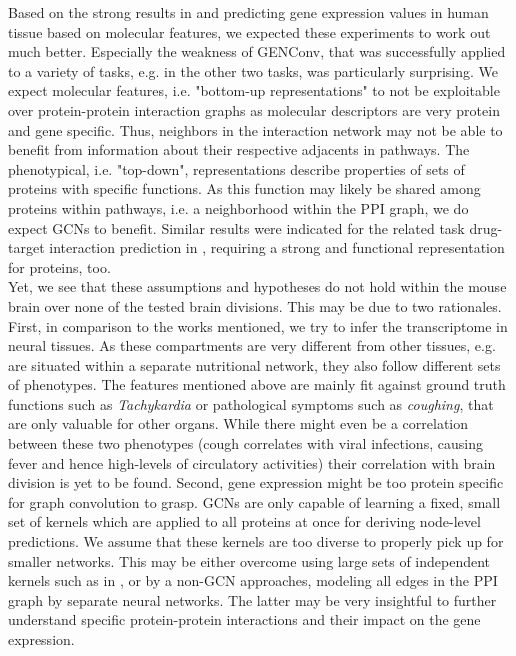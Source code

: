 \documentclass[]{article}
\begin{document}
Based on the strong results in \citet{schulte2021integration} and \citet{wang2021mogonet} predicting gene expression values in human tissue based on molecular features, we expected these experiments to work out much better. Especially the weakness of GENConv, that was successfully applied to a variety of tasks, e.g. in the other two tasks, was particularly surprising. 
We expect molecular features, i.e. "bottom-up representations" to not be exploitable over protein-protein interaction graphs as molecular descriptors are very protein and gene specific. Thus, neighbors in the interaction network may not be able to benefit from information about their respective adjacents in pathways. The phenotypical, i.e. "top-down", representations describe properties of sets of proteins with specific functions. As this function may likely be shared among proteins within pathways, i.e. a neighborhood within the PPI graph, we do expect GCNs to benefit. Similar results were indicated for the related task drug-target interaction prediction in \citet{hinnerichs2021dti}, requiring a strong and functional representation for proteins, too. \\

Yet, we see that these assumptions and hypotheses do not hold within the mouse brain over none of the  tested brain divisions. This may be due to two rationales. First, in comparison to the works mentioned, we try to infer the transcriptome in neural tissues. As these compartments are very different from other tissues, e.g. are situated within a separate nutritional network, they also follow different sets of phenotypes. The features mentioned above are mainly fit against ground truth functions such as \textit{Tachykardia} or pathological symptoms such as \textit{coughing}, that are only valuable for other organs. While there might even be a correlation between these two phenotypes  (cough correlates with viral infections, causing fever and hence high-levels of circulatory activities) their correlation with brain division is yet to be found. Second, gene expression might be too protein specific for graph convolution to grasp. GCNs are only capable of learning a fixed, small set of kernels which are applied to all proteins at once for deriving node-level predictions. We assume that these kernels are too diverse to properly pick up for smaller networks. This may be either overcome using large sets of independent kernels such as in \citet{schulte2021integration}, or by a non-GCN approaches, modeling all edges in the PPI graph by separate neural networks. The latter may be very insightful to further understand specific protein-protein interactions and their impact on the gene expression. \\
\end{document}
